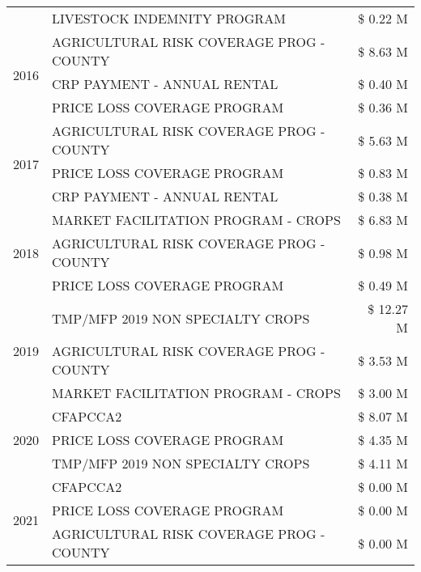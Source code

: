 \begin{tabular}{llr}
 & LIVESTOCK INDEMNITY PROGRAM & \$ 0.22 M \\
\cline{1-3}
\multirow[t]{3}{*}{2016} & AGRICULTURAL RISK COVERAGE PROG - COUNTY & \$ 8.63 M \\
 & CRP PAYMENT - ANNUAL RENTAL & \$ 0.40 M \\
 & PRICE LOSS COVERAGE PROGRAM & \$ 0.36 M \\
\cline{1-3}
\multirow[t]{3}{*}{2017} & AGRICULTURAL RISK COVERAGE PROG - COUNTY & \$ 5.63 M \\
 & PRICE LOSS COVERAGE PROGRAM & \$ 0.83 M \\
 & CRP PAYMENT - ANNUAL RENTAL & \$ 0.38 M \\
\cline{1-3}
\multirow[t]{3}{*}{2018} & MARKET FACILITATION PROGRAM - CROPS & \$ 6.83 M \\
 & AGRICULTURAL RISK COVERAGE PROG - COUNTY & \$ 0.98 M \\
 & PRICE LOSS COVERAGE PROGRAM & \$ 0.49 M \\
\cline{1-3}
\multirow[t]{3}{*}{2019} & TMP/MFP 2019 NON SPECIALTY CROPS & \$ 12.27 M \\
 & AGRICULTURAL RISK COVERAGE PROG - COUNTY & \$ 3.53 M \\
 & MARKET FACILITATION PROGRAM - CROPS & \$ 3.00 M \\
\cline{1-3}
\multirow[t]{3}{*}{2020} & CFAPCCA2 & \$ 8.07 M \\
 & PRICE LOSS COVERAGE PROGRAM & \$ 4.35 M \\
 & TMP/MFP 2019 NON SPECIALTY CROPS & \$ 4.11 M \\
\cline{1-3}
\multirow[t]{3}{*}{2021} & CFAPCCA2 & \$ 0.00 M \\
 & PRICE LOSS COVERAGE PROGRAM & \$ 0.00 M \\
 & AGRICULTURAL RISK COVERAGE PROG - COUNTY & \$ 0.00 M \\
\cline{1-3}
\bottomrule
\end{tabular}
